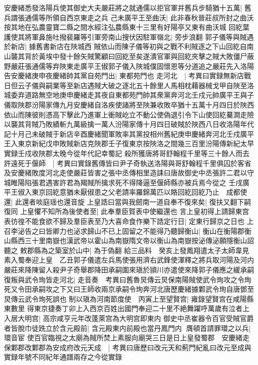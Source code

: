 安慶緒悉發洛陽兵使其御史大夫嚴莊將之就通儒以拒官軍并舊兵步騎猶十五萬|{
	舊兵謂張通儒等所領自西京東走之兵}
己未廣平王至曲沃|{
	此非春秋晉莊叔所封之曲沃按其地在弘農靈寶二縣之間水經注弘農縣東十三里有好陽亭又東有曲沃城}
回紇葉護使其將軍鼻施吐撥裴羅等引軍旁南山搜伏因駐軍嶺北|{
	旁步浪翻}
郭子儀等與賊遇於新店|{
	據舊書新店在陜城西}
賊依山而陳子儀等初與之戰不利賊逐之下山回紇自南山襲其背於黃埃中發十餘矢賊驚顧曰回紇至矣遂潰官軍與回紇夾擊之賊大敗僵尸蔽野嚴莊張通儒等弃陜東走廣平王俶郭子儀入陜城僕固懷恩等分道追之嚴莊先入洛陽告安慶緒庚申夜慶緒帥其黨自苑門出|{
	東都苑門也}
走河北　|{
	考異曰實録無新店戰日但云子儀與嗣業等至新店遇賊大破之逐北五十餘里人馬相枕藉器械戈甲自陜至洛城委弃道路無空地庚申慶緒走其夜自東都苑門帥其衆黨奔河北壬戍元帥廣平王與子儀取陜郡汾陽家傳九月安慶緒自洛疾使諸將至陜兼收敗卒猶十五萬十月四日於陜西依山而陳彼則憑高下擊此乃進軍上衝賊屹立不動公使偽退引令下山使回紇驀澗走險以襲其背賊乃敗績斬九萬級擒一萬人汾陽家傳十月四日破賊於陜西八日收洛陽年代記十月己未破賊于新店辛酉慶緒聞軍敗率其黨投相州舊紀庚申慶緒奔河北壬戍廣平王入東京新紀戊申敗賊新店克陜郡壬子復東京按陜洛之間幾三百里汾陽傳新紀太早實録壬戍收陜郡太晚今從年代記幸蜀記}
殺所獲唐將哥舒翰程千里等三十餘人而去許遠死于偃師　|{
	考異曰實錄舊傳皆曰尹子奇執送洛陽與哥舒翰程千里俱囚於客省及安慶緒敗度河北走使嚴莊皆害之張中丞傳相里造誄曰唐故御史中丞張許二君以守城睢陽陷張君遇害許君為羯賊所擒求死不得降逼至偃師縣亦被兵焉今從之}
壬戌廣平王俶入東京回紇意猶未厭俶患之父老請率羅錦萬匹以賂回紇回紇乃止　成都使還|{
	此還者啖庭瑶也還音旋}
上皇誥曰當與我劒南一道自奉不復來矣|{
	復扶又翻下嗣復同}
上皇懼不知所為後使者至|{
	此奉羣臣賀表中使繼還也}
言上皇初得上請歸東宫表彷徨不能食欲不歸及羣臣表至乃大喜命食作樂下誥定行日|{
	定東行歸京之日也}
上召李泌告之曰皆卿力也泌求歸山不已上固留之不能得乃聽歸衡山|{
	衡山在衡陽郡衡山縣西三十里南嶽也漢武帝以霍山為南嶽隋文帝以衡山為南嶽按泌傳泌願隱衡山詔聽之}
敕郡縣為之築室於山中|{
	為于偽翻}
給三品料　癸亥上發鳳翔遣太子太師韋見素入蜀奉迎上皇　乙丑郭子儀遣左兵馬使張用濟右武鋒使渾釋之將兵取河陽及河内嚴莊來降陳留人殺尹子奇舉郡降田承嗣圍來瑱於頴川亦遣使來降郭子儀應之緩承嗣復叛與武令珣皆走河北|{
	走音奏　考異曰舊魯炅傳云炅保南陽賊使武令珣攻之令珣死又令田承嗣攻之下又曰王師收兩京承嗣令珣奔河北唐歷慶緒據鄴武令珣自唐鄧至炅傳云武令珣死誤也}
制以瑱為河南節度使　丙寅上至望賢宫|{
	雍錄望賢宫在咸陽縣東數里}
得東京捷奏丁卯上入西京百姓出國門奉迎二十里不絶舞躍呼萬歲有泣者上入居大明宫|{
	高宗咸亨元年改蓬萊宫為大明宫即東内}
御史中丞崔器令百官受賊官爵者皆脫巾徒跣立於含元殿前|{
	含元殿東内前殿也當丹鳳門内}
膺頓首請罪環之以兵|{
	環音宦}
使百官臨視之太廟為賊所焚上素服向廟哭三日是日上皇發蜀郡　安慶緒走保鄴郡改鄴郡為安成府改元天成　|{
	考異曰唐歷曰改元天和薊門紀亂曰改元至成與實録年號不同紀年通譜兩存之今從實錄}
